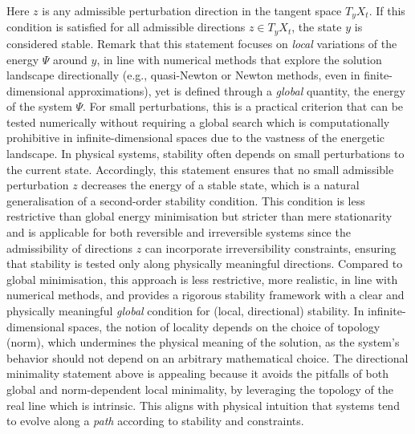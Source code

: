 \documentclass[10pt]{article}
\begin{document}
{
        Here $z$ is any admissible perturbation direction in the tangent space $T_y X_t$. If this condition is satisfied for all admissible directions $z \in T_y X_t$, the state $y$ is considered stable.
        Remark that this statement focuses on \emph{local} variations of the energy $\Psi$ around $y$, in line with numerical methods that explore the solution landscape directionally (e.g., quasi-Newton or Newton methods, even in finite-dimensional approximations), yet is defined through a \emph{global} quantity, the energy of the system $\Psi$.
        For small perturbations, this is a practical criterion that can be tested numerically without requiring a global search which is computationally prohibitive in infinite-dimensional spaces due to the vastness of the energetic landscape.
        In physical systems, stability often depends on small perturbations to the current state. Accordingly, this statement ensures that no small admissible perturbation $z$ decreases the energy of a stable state, which is a natural generalisation of a second-order stability condition.
        This
        condition is less restrictive than global energy minimisation but stricter than mere stationarity and is applicable for both reversible and irreversible systems since the admissibility of directions $z$ can incorporate irreversibility constraints, ensuring that stability is tested only along physically meaningful directions.
        Compared to global minimisation, this approach is less restrictive, more realistic, in line with numerical methods, and provides a rigorous stability framework with a clear and physically meaningful \emph{global} condition for (local, directional) stability.
        In infinite-dimensional spaces, the notion of locality depends on the choice of topology (norm), which undermines the physical meaning of the solution, as the system’s behavior should not depend on an arbitrary mathematical choice.
        The directional minimality statement above is appealing because it avoids the pitfalls of both global and norm-dependent local minimality, by leveraging the topology of the real line which is intrinsic. This aligns with physical intuition that systems tend to evolve along a \emph{path} according to stability and constraints.
    }
\end{document}
